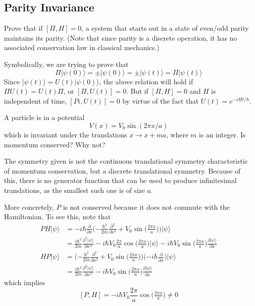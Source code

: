 \documentclass[../principles-of-quantum-mechanics.tex]{subfiles}
\begin{document}
\begin{questions}
		\subsection{Parity Invariance}
		\question Prove that if $[\Pi, H] = 0$, a system that starts out in a state of even/odd parity maintains its parity. (Note that since parity is a discrete operation, it has no associated conservation law in classical mechanics.)
		
		\begin{solution}
			Symbolically, we are trying to prove that
			$$\Pi|\psi(0)\rangle = \pm|\psi(0)\rangle = \pm|\psi(t)\rangle = \Pi|\psi(t)\rangle$$
			Since $|\psi(t)\rangle = U(t)|\psi(0)\rangle$, the above relation will hold if $\Pi U(t) = U(t)\Pi$, or $[\Pi, U(t)] = 0$. But if $[\Pi, H] = 0$ and $H$ is independent of time, $[Pi, U(t)] = 0$ by virtue of the fact that $U(t)=e^{-iHt/\hbar}$.
		\end{solution}
		
		\question A particle is in a potential
		$$V(x) = V_0\sin(2\pi x/a)$$
		which is invariant under the translations $x \to x + ma$, where $m$ is an integer. Is momentum conserved? Why not?
		
		\begin{solution}
			The symmetry given is not the continuous translational symmetry characteristic of momentum conservation, but a discrete translational symmetry. Because of this, there is no generator function that can be used to produce infinitesimal translations, as the smallest such one is of size $a$.
			
			More concretely, $P$ is not conserved because it does not commute with the Hamiltonian. To see this, note that
			\begin{align*}
				PH|\psi\rangle &= {-i\hbar}\frac{\partial}{\partial x}\Big({-\frac{\hbar^2}{2m}}\frac{\partial^2}{\partial x^2} + V_0\sin\big(\tfrac{2\pi x}{a}\big)\Big)|\psi\rangle \\
				&= \frac{i\hbar^3}{2m}\frac{\partial^3|\psi\rangle}{\partial x^3} - i\hbar V_0\frac{2\pi}{a}\cos\big(\tfrac{2\pi x}{a}\big)|\psi\rangle - i\hbar V_0\sin\big(\tfrac{2\pi x}{a}\big)\frac{\partial|\psi\rangle}{\partial x} \\
				HP|\psi\rangle &= \Big({-\frac{\hbar^2}{2m}}\frac{\partial^2}{\partial x^2} + V_0\sin\big(\tfrac{2\pi x}{a}\big)\Big)\Big({-i\hbar}\frac{\partial}{\partial x}\Big)|\psi\rangle \\
				&= \frac{i\hbar^3}{2m}\frac{\partial^3|\psi\rangle}{\partial x^3} - i\hbar V_0\sin\big(\tfrac{2\pi x}{a}\big)\frac{\partial |\psi\rangle }{\partial x}
			\end{align*}
			which implies
			$$[P, H] = {-i\hbar V_0\frac{2\pi}{a}}\cos\big(\tfrac{2\pi x}{a}\big) \neq 0$$
		\end{solution}
		

\end{questions}
\end{document}
